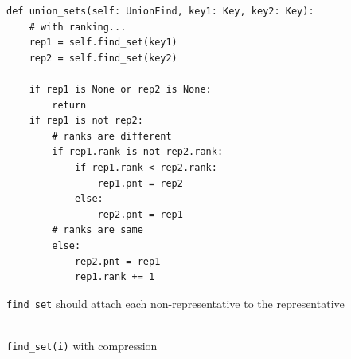 \documentclass[mathserif, handout]{beamer}
\begin{document}
\begin{frame}[fragile]
\begin{proofbox}
\begin{lstlisting}[style=mypython]
def union_sets(self: UnionFind, key1: Key, key2: Key):
    # with ranking...
    rep1 = self.find_set(key1)
    rep2 = self.find_set(key2)

    if rep1 is None or rep2 is None:
        return
    if rep1 is not rep2:
        # ranks are different
        if rep1.rank is not rep2.rank:
            if rep1.rank < rep2.rank:
                rep1.pnt = rep2
            else:
                rep2.pnt = rep1
        # ranks are same
        else:
            rep2.pnt = rep1
            rep1.rank += 1
\end{lstlisting}
\end{proofbox}

\end{frame}


\begin{frame}
\texttt{find\_set} should attach each non-representative to the representative
\begin{center}
 \\
\footnotesize\color{gray} \texttt{find\_set(i)} with compression
\end{center}
\vspace{-3mm}
\begin{figure}
\centering
{}
\end{figure}
\begin{center}
\end{center}
\end{frame}
\end{document}
